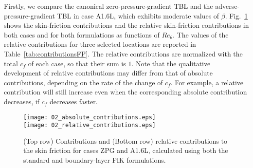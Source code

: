 Firstly, we compare the canonical zero-pressure-gradient TBL and the adverse-pressure-gradient TBL in case A1.6L, which exhibits moderate values of $\beta$. Fig.~\ref{fig:contributionsFP} shows the skin-friction contributions and the relative skin-friction contributions in both cases and for both formulations as functions of $Re_\theta$. The values of the relative contributions for three selected locations are reported in Table~\ref{tab:contributionsFP}. The relative contributions are normalized with the total $c_f$ of each case, so that their sum is $1$. Note that the qualitative development of relative contributions may differ from that of absolute contributions, depending on the rate of the change of $c_f$. For example, a relative contribution will still increase even when the corresponding absolute contribution decreases, if $c_f$ decreases faster. 
\begin{figure}
\centering
\texttt{[image: 02\_absolute\_contributions.eps]}\\%
\texttt{[image: 02\_relative\_contributions.eps]}%
\caption{\label{fig:contributionsFP} (Top row) Contributions and (Bottom row) relative contributions to the skin friction for cases ZPG and A1.6L, calculated using both the standard and boundary-layer FIK formulations.}
\end{figure}
